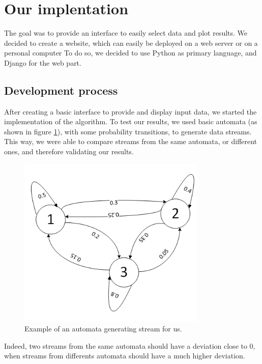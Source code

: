 \section{Our implentation}
	The goal was to provide an interface to easily select data and plot results.
	We decided to create a website, which can easily be deployed on a web server or on a personal computer
	To do so, we decided to use Python as primary language, and Django for the web part.

	\subsection{Development process}
		After creating a basic interface to provide and display input data, we started the implementation of the algorithm.
		To test our results, we used basic automata (as shown in figure \ref{fig:automata}), with some probability transitions, to generate data streams.
		This way, we were able to compare streams from the same automata, or different ones, and therefore validating our results.

		\begin{figure}
			\begin{center}
				\includegraphics[width=0.8\textwidth]{figures/automata.png}
			\end{center}
			\caption{Example of an automata generating stream for us.}
			\label{fig:automata}
		\end{figure}

		Indeed, two streams from the same automata should have a deviation close to 0, when streams from differents automata should have a much higher deviation.

	